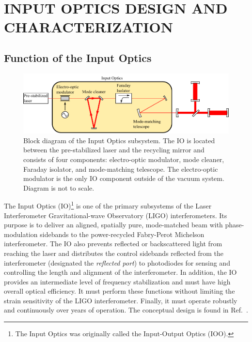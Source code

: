 \chapter{INPUT OPTICS DESIGN AND CHARACTERIZATION}

\section{Function of the Input Optics}
\label{sec:role}

\begin{figure}
\begin{centering}
\includegraphics{figures/InputOpticsBlock_thesis.pdf}
\caption[Block diagram of the Input Optics subsystem.]{Block diagram
  of the Input Optics subsystem. The IO is located between the
  pre-stabilized laser and the recycling mirror and consists of four
  components: electro-optic modulator, mode cleaner, Faraday isolator,
  and mode-matching telescope. The electro-optic modulator is the only
  IO component outside of the vacuum system. Diagram is not to scale.}
\label{fig:IOblock}
\end{centering}
\end{figure}

The Input Optics (IO)\footnote{The Input Optics was originally called
  the Input-Output Optics (IOO).} is one of the primary subsystems of
the Laser Interferometer Gravitational-wave Observatory (LIGO)
interferometers. Its purpose is to deliver an aligned, spatially
pure, mode-matched beam with phase-modulation sidebands to the
power-recycled Fabry-Perot Michelson interferometer. The IO also
prevents reflected or backscattered light from reaching the laser and
distributes the control sidebands reflected from the interferometer
(designated the \emph{reflected port}) to photodiodes for sensing and
controlling the length and alignment of the interferometer. In
addition, the IO provides an intermediate level of frequency
stabilization and must have high overall optical efficiency. It must
perform these functions without limiting the strain sensitivity of the
LIGO interferometer.  Finally, it must operate robustly and
continuously over years of operation. The conceptual design is found
in Ref.~\citep{Camp1996InputOutput}.

